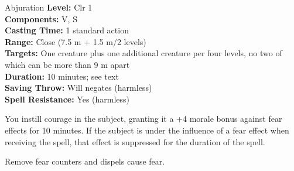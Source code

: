 {Abjuration}
{
	\textbf{Level:}
	Clr 1\\
	\textbf{Components:}
	V, S\\
	\textbf{Casting Time:}
	1 standard action\\
	\textbf{Range:}
	Close (7.5 m + 1.5 m/2 levels)\\
	\textbf{Targets:}
	One creature plus one additional creature per four levels, no two of which can be more than 9 m apart\\
	\textbf{Duration:}
	10 minutes; see text\\
	\textbf{Saving Throw:}
	Will negates (harmless)\\
	\textbf{Spell Resistance:}
	Yes (harmless)\\
}
{
	You instill courage in the subject, granting it a +4 morale bonus against fear effects for 10 minutes. If the subject is under the influence of a fear effect when receiving the spell, that effect is suppressed for the duration of the spell.

	Remove fear counters and dispels cause fear.

}
